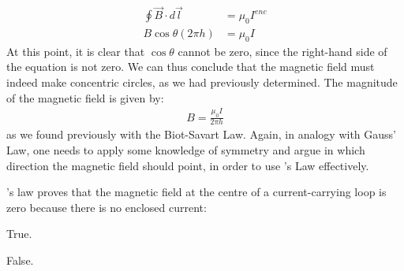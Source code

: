 \begin{align*}
\oint \vec B \cdot d\vec l &=\mu_0 I^{enc}\\
B\cos\theta (2\pi h) &= \mu_0 I
\end{align*} 
At this point, it is clear that $\cos\theta$ cannot be zero, since the right-hand side of the equation is not zero. We can thus conclude that the magnetic field must indeed make concentric circles, as we had previously determined. The magnitude of the magnetic field is given by:
\begin{align*}
B = \frac{\mu_0 I}{2\pi h}
\end{align*}
as we found previously with the Biot-Savart Law. Again, in analogy with Gauss' Law, one needs to apply some knowledge of symmetry and argue in which direction the magnetic field should point, in order to use \ampere's Law effectively. 

\begin{checkpoint}{}
	\begin{MCquestion}{\ampere's law proves that the magnetic field at the centre of a current-carrying loop is zero because there is no enclosed current:}
		\item True.
		\item False. \correct
	\end{MCquestion}
\end{checkpoint}


